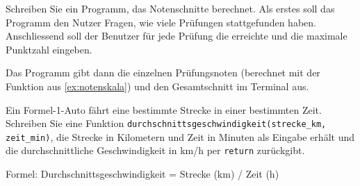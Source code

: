 \begin{myexercise}
	Schreiben Sie ein Programm, das Notenschnitte berechnet. Als erstes soll das Programm den Nutzer Fragen, wie viele Prüfungen stattgefunden haben. Anschliessend soll der Benutzer für jede Prüfung die erreichte und die maximale Punktzahl eingeben.

	Das Programm gibt dann die einzelnen Prüfungsnoten (berechnet mit der Funktion aus \cref{ex:notenskala}) und den Gesamtschnitt im Terminal aus.
	\begin{myanswer}
		
	\end{myanswer}

\end{myexercise}


\begin{myexercise}\label{ex:f1}
	Ein Formel-1-Auto fährt eine bestimmte Strecke in einer bestimmten Zeit. Schreiben Sie eine Funktion \lstinline|durchschnittsgeschwindigkeit(strecke_km, zeit_min)|, die Strecke in Kilometern und Zeit in Minuten als Eingabe erhält und die durchschnittliche Geschwindigkeit in km/h per \lstinline|return| zurückgibt.

	Formel: Durchschnittsgeschwindigkeit = Strecke (km) / Zeit (h)

	\begin{myanswer}
		
	\end{myanswer}
\end{myexercise}

